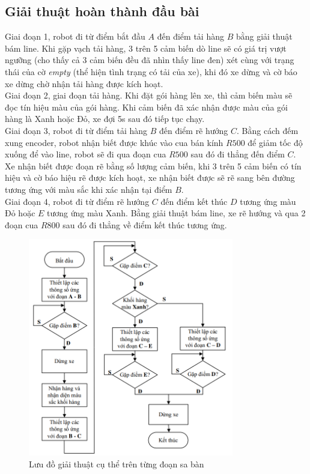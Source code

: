           \subsection{Giải thuật hoàn thành đầu bài}
               \hspace*{0.6cm}Giai đoạn 1, robot đi từ điểm bắt đầu $A$ đến điểm tải hàng $B$ bằng giải thuật bám line. Khi gặp vạch tải hàng, 3 trên 5 cảm biến dò line sẽ có giá trị vượt ngưỡng (cho thấy cả 3 cảm biến đều đã nhìn thấy line đen)
               xét cùng với trạng thái của cờ \textit{empty} (thể hiện tình trạng có tải của xe), khi đó xe dừng và cờ báo xe dừng chờ nhận tải hàng được kích hoạt.\\
               \hspace*{0.6cm}Giai đoạn 2, giai đoạn tải hàng. Khi đặt gói hàng lên xe, thì cảm biến màu sẽ đọc
               tín hiệu màu của gói hàng. Khi cảm biến đã xác nhận được màu của gói hàng là Xanh hoặc
               Đỏ, xe đợi 5s sau đó tiếp tục chạy.\\
               \hspace*{0.6cm}Giai đoạn 3, robot đi từ điểm tải hàng $B$ đến điểm rẽ hướng $C$. Bằng cách đếm xung encoder, robot nhận biết được khúc vào cua bán kính $R500$ để giảm tốc độ xuống để vào line, robot sẽ đi qua đoạn cua $R500$ sau đó đi thẳng đến điểm $C$. Xe nhận biết
               được đoạn rẽ bằng số lượng cảm biến, khi 3 trên 5 cảm biến có tín hiệu và cờ báo hiệu rẽ được kích hoạt,
               xe nhận biết được sẽ rẽ sang bên đường tương ứng với màu sắc khi xác nhận tại điểm $B$.\\
               \hspace*{0.6cm}Giai đoạn 4, robot đi từ điểm rẽ hướng $C$ đến điểm kết thúc $D$ tương ứng màu Đỏ
               hoặc $E$ tương ứng màu Xanh. Bằng giải thuật bám line, xe rẽ hướng và qua 2 đoạn
               cua $R800$ sau đó đi thẳng về điểm kết thúc tương ứng.
               \begin{figure}[H]
                    \centering
                    \includegraphics[width=0.8\textwidth]{pictures/chapter7/flow2.png}
                    \caption{Lưu đồ giải thuật cụ thể trên từng đoạn sa bàn}
                    \label{flow2}
               \end{figure}



